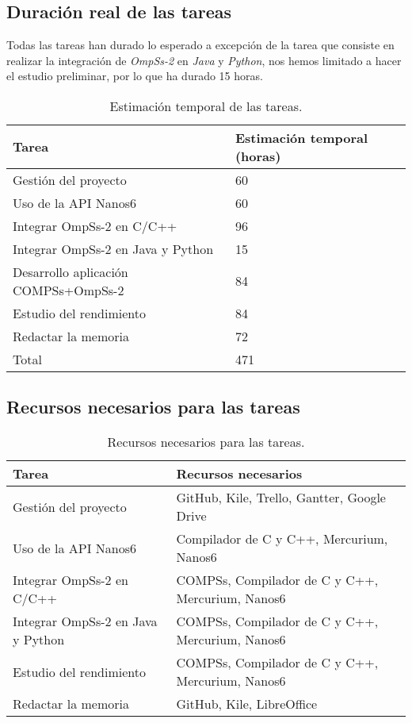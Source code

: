 \subsection{Duración real de las tareas}

Todas las tareas han durado lo esperado a excepción de la tarea que consiste en realizar la integración de \textit{OmpSs-2} en \textit{Java} y \textit{Python}, nos hemos limitado a hacer el estudio preliminar, por lo que ha durado 15 horas.

\begin{table}[H]
 \centering
 \begin{tabular}{|| l | l ||}
  \hline
  Tarea & Estimación temporal (horas) 			\\
  \hline\hline
   Gestión del proyecto & 60 					\\
   \hline
   Uso de la API Nanos6 & 60 					\\
   \hline
   Integrar OmpSs-2 en C/C++ & 96 				\\
   \hline
   Integrar OmpSs-2 en Java y Python & 15 		\\
   \hline
   Desarrollo aplicación COMPSs+OmpSs-2 & 84 	\\
   \hline
   Estudio del rendimiento & 84 				\\
   \hline
   Redactar la memoria & 72 					\\
  \hline
  Total & 471 									\\
  \hline
 \end{tabular}
 \caption{Estimación temporal de las tareas.}
\end{table}

\subsection{Recursos necesarios para las tareas}

\begin{table}[H]
 \centering
 \begin{tabular}{| l | l |}
 \hline
 Tarea & Recursos necesarios \\
 \hline\hline  
 Gestión del proyecto & GitHub, Kile, Trello, Gantter, Google Drive \\
 \hline
 Uso de la API Nanos6 & Compilador de C y C++, Mercurium, Nanos6 \\
 \hline
 Integrar OmpSs-2 en C/C++ & COMPSs, Compilador de C y C++, Mercurium, Nanos6 \\
 \hline
 Integrar OmpSs-2 en Java y Python & COMPSs, Compilador de C y C++, Mercurium, Nanos6 \\
 \hline
 Estudio del rendimiento & COMPSs, Compilador de C y C++, Mercurium, Nanos6 \\
 \hline
 Redactar la memoria & GitHub, Kile, LibreOffice \\
 \hline
 \end{tabular}
 \caption{Recursos necesarios para las tareas.}
\end{table}

